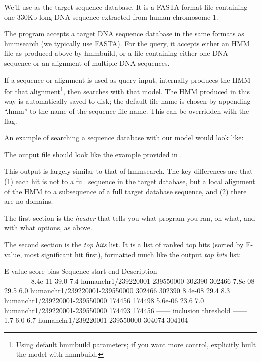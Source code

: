 We'll use  as the target sequence database. It is
a FASTA format file containing one 330Kb long DNA sequence extracted from human
chromosome 1.

The program  accepts a target DNA sequence database in the
same formats as hmmsearch (we typically use FASTA). For the query, it accepts
either an HMM file as produced above by hmmbuild, or a file containing either
one DNA sequence or an alignment of multiple DNA sequences. 

If a sequence or alignment is used as query input,  internally
produces the HMM for that alignment\footnote{Using default hmmbuild
parameters; if you want more control, explicitly built the model with
hmmbuild.}, then searches with that model. The HMM produced in this way is
automatically saved to disk; the default file name is chosen by appending
``.hmm'' to the name of the sequence file name. This can be overridden with the
 flag.

An example of searching a sequence database with our  model
would look like:


The output file  should look like the example provided in
.

This output is largely similar to that of hmmsearch. The key differences are
that (1) each hit is not to a full sequence in the target database, but a
local alignment of the HMM to a subsequence of a full target database sequence,
and (2) there are no domains.

The first section is the \emph{header} that tells you what program you ran, on
what, and with what options, as above.

The second section is the \emph{top hits} list. It is a list
of ranked top hits (sorted by E-value, most significant hit first),
formatted much like the  output \emph{top hits} list:

\begin{samepage}
\begin{sreoutput}
    E-value  score  bias  Sequence                       start    end  Description
    ------- ------ -----  --------                       -----  -----  -----------
    8.4e-11   39.0   7.4  humanchr1/239220001-239550000 302390 302466
    7.8e-08   29.5   6.0  humanchr1/239220001-239550000 302466 302390
    8.4e-08   29.4   8.3  humanchr1/239220001-239550000 174456 174498
    5.6e-06   23.6   7.0  humanchr1/239220001-239550000 174493 174456
  ------ inclusion threshold ------
        1.7    6.0   6.7  humanchr1/239220001-239550000 304074 304104
\end{sreoutput}
\end{samepage}

